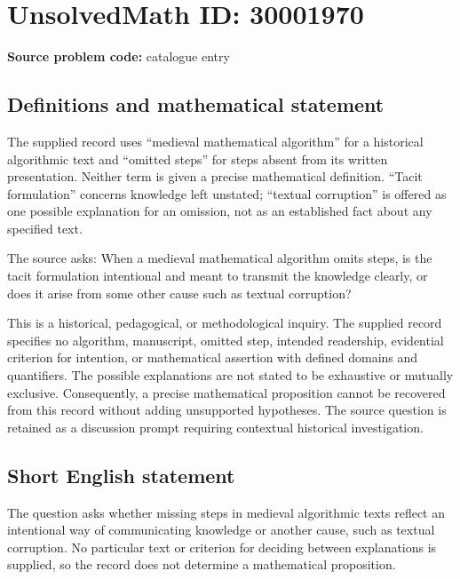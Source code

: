 \documentclass[11pt]{article}
\begin{document}
\section*{UnsolvedMath ID: 30001970}
\textbf{Source problem code:} catalogue entry
\subsection{Definitions and mathematical statement}
The supplied record uses ``medieval mathematical algorithm'' for a historical algorithmic text and ``omitted steps'' for steps absent from its written presentation. Neither term is given a precise mathematical definition. ``Tacit formulation'' concerns knowledge left unstated; ``textual corruption'' is offered as one possible explanation for an omission, not as an established fact about any specified text.

The source asks: When a medieval mathematical algorithm omits steps, is the tacit formulation intentional and meant to transmit the knowledge clearly, or does it arise from some other cause such as textual corruption?

This is a historical, pedagogical, or methodological inquiry. The supplied record specifies no algorithm, manuscript, omitted step, intended readership, evidential criterion for intention, or mathematical assertion with defined domains and quantifiers. The possible explanations are not stated to be exhaustive or mutually exclusive. Consequently, a precise mathematical proposition cannot be recovered from this record without adding unsupported hypotheses. The source question is retained as a discussion prompt requiring contextual historical investigation.
\subsection{Short English statement}
The question asks whether missing steps in medieval algorithmic texts reflect an intentional way of communicating knowledge or another cause, such as textual corruption. No particular text or criterion for deciding between explanations is supplied, so the record does not determine a mathematical proposition.
\end{document}
